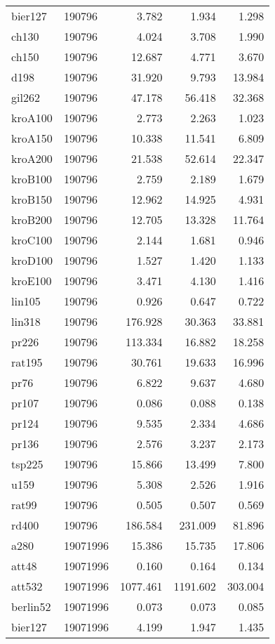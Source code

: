 \begin{center}
\begin{longtable}{llrrr}
bier127  & 190796 & 3.782 & 1.934 & 1.298\\
ch130  & 190796 & 4.024 & 3.708 & 1.990\\
ch150  & 190796 & 12.687 & 4.771 & 3.670\\
d198  & 190796 & 31.920 & 9.793 & 13.984\\
gil262  & 190796 & 47.178 & 56.418 & 32.368\\
kroA100  & 190796 & 2.773 & 2.263 & 1.023\\
kroA150  & 190796 & 10.338 & 11.541 & 6.809\\
kroA200  & 190796 & 21.538 & 52.614 & 22.347\\
kroB100  & 190796 & 2.759 & 2.189 & 1.679\\
kroB150  & 190796 & 12.962 & 14.925 & 4.931\\
kroB200  & 190796 & 12.705 & 13.328 & 11.764\\
kroC100  & 190796 & 2.144 & 1.681 & 0.946\\
kroD100  & 190796 & 1.527 & 1.420 & 1.133\\
kroE100  & 190796 & 3.471 & 4.130 & 1.416\\
lin105  & 190796 & 0.926 & 0.647 & 0.722\\
lin318  & 190796 & 176.928 & 30.363 & 33.881\\
pr226  & 190796 & 113.334 & 16.882 & 18.258\\
rat195  & 190796 & 30.761 & 19.633 & 16.996\\
pr76  & 190796 & 6.822 & 9.637 & 4.680\\
pr107  & 190796 & 0.086 & 0.088 & 0.138\\
pr124  & 190796 & 9.535 & 2.334 & 4.686\\
pr136  & 190796 & 2.576 & 3.237 & 2.173\\
tsp225  & 190796 & 15.866 & 13.499 & 7.800\\
u159  & 190796 & 5.308 & 2.526 & 1.916\\
rat99  & 190796 & 0.505 & 0.507 & 0.569\\
rd400  & 190796 & 186.584 & 231.009 & 81.896\\
a280  & 19071996 & 15.386 & 15.735 & 17.806\\
att48  & 19071996 & 0.160 & 0.164 & 0.134\\
att532  & 19071996 & 1077.461 & 1191.602 & 303.004\\
berlin52  & 19071996 & 0.073 & 0.073 & 0.085\\
bier127  & 19071996 & 4.199 & 1.947 & 1.435\\

\end{longtable}
\end{center}
